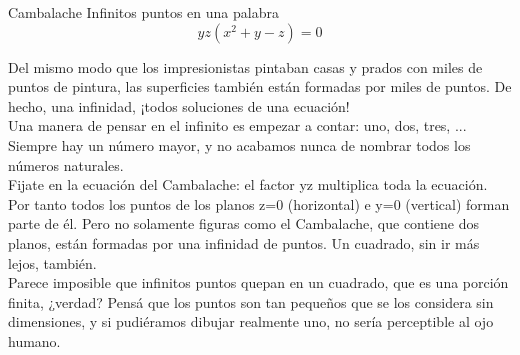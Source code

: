 \begin{surferPage}{Cambalache}
Infinitos puntos en una palabra\\
\smallskip
\[y z (x^2	+ y - z)	= 0\]

\vspace{0.3cm}
Del mismo modo que los impresionistas pintaban casas y prados con miles de puntos de pintura, las
superficies tambi\'en est\'an formadas por miles de puntos. De hecho, una infinidad, ¡todos soluciones de
una ecuaci\'on!\\
\vspace{0.3cm}
Una manera de pensar en el infinito es empezar a contar: uno, dos, tres, ... Siempre hay un n\'umero mayor, y no acabamos nunca de nombrar todos los n\'umeros naturales.\\
\vspace{0.3cm}
Fijate en la ecuaci\'on del Cambalache: el factor yz multiplica toda la ecuaci\'on. Por tanto todos los puntos
de los planos z=0 (horizontal) e y=0 (vertical) forman parte de \'el.
Pero no solamente figuras como el Cambalache, que contiene dos planos, est\'an formadas por una infinidad de
puntos. Un cuadrado, sin ir m\'as lejos, tambi\'en.\\
\vspace{0.3cm}
Parece imposible que infinitos puntos quepan en un cuadrado, que es una porci\'on finita, ¿verdad? Pens\'a
que los puntos son tan pequeños que se los considera sin dimensiones, y si pudi\'eramos dibujar realmente
uno, no ser\'ia perceptible al ojo humano.
\end{surferPage}

